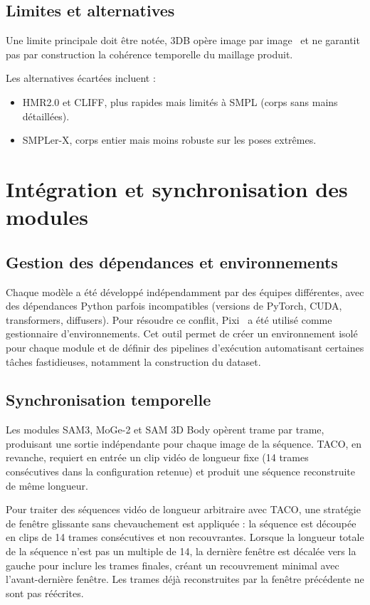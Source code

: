 \subsection{Limites et alternatives}

Une limite principale doit être notée, 3DB opère image par image~\cite{SAM-3D-Body-2026} et ne garantit pas par construction la cohérence temporelle du maillage produit. 

Les alternatives écartées incluent :
\begin{itemize}
  \item HMR2.0 et CLIFF, plus rapides mais limités à SMPL (corps sans mains détaillées).
  \item SMPLer-X, corps entier mais moins robuste sur les poses extrêmes.
\end{itemize}

\section{Intégration et synchronisation des modules} \label{sec:integration}

\subsection{Gestion des dépendances et environnements}

Chaque modèle a été développé indépendamment par des équipes différentes, avec des dépendances Python parfois incompatibles (versions de PyTorch, CUDA, transformers, diffusers). Pour résoudre ce conflit, Pixi~\cite{Pixi-2024} a été utilisé comme gestionnaire d'environnements. Cet outil permet de créer un environnement isolé pour chaque module et de définir des pipelines d'exécution automatisant certaines tâches fastidieuses, notamment la construction du dataset.

\subsection{Synchronisation temporelle}

Les modules SAM3, MoGe-2 et SAM 3D Body opèrent trame par trame, produisant une sortie indépendante pour chaque image de la séquence. TACO, en revanche, requiert en entrée un clip vidéo de longueur fixe (14 trames consécutives dans la configuration retenue) et produit une séquence reconstruite de même longueur.

Pour traiter des séquences vidéo de longueur arbitraire avec TACO, une stratégie de fenêtre glissante sans chevauchement est appliquée : la séquence est découpée en clips de 14 trames consécutives et non recouvrantes. Lorsque la longueur totale de la séquence n'est pas un multiple de 14, la dernière fenêtre est décalée vers la gauche pour inclure les trames finales, créant un recouvrement minimal avec l'avant-dernière fenêtre. Les trames déjà reconstruites par la fenêtre précédente ne sont pas réécrites.

